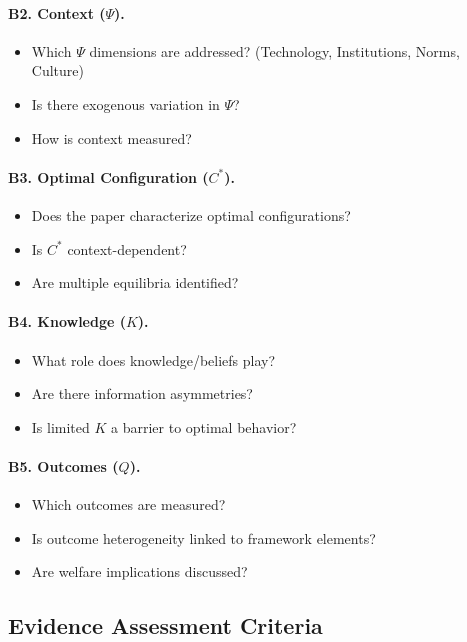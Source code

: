 \documentclass[12pt,a4paper]{article}
\begin{document}
\paragraph{B2. Context ($\Psi$).}
\begin{itemize}
  \item Which $\Psi$ dimensions are addressed? (Technology, Institutions, Norms, Culture)
  \item Is there exogenous variation in $\Psi$?
  \item How is context measured?
\end{itemize}

\paragraph{B3. Optimal Configuration ($C^*$).}
\begin{itemize}
  \item Does the paper characterize optimal configurations?
  \item Is $C^*$ context-dependent?
  \item Are multiple equilibria identified?
\end{itemize}

\paragraph{B4. Knowledge ($K$).}
\begin{itemize}
  \item What role does knowledge/beliefs play?
  \item Are there information asymmetries?
  \item Is limited $K$ a barrier to optimal behavior?
\end{itemize}

\paragraph{B5. Outcomes ($Q$).}
\begin{itemize}
  \item Which outcomes are measured?
  \item Is outcome heterogeneity linked to framework elements?
  \item Are welfare implications discussed?
\end{itemize}

\subsection{Evidence Assessment Criteria}
\end{document}
